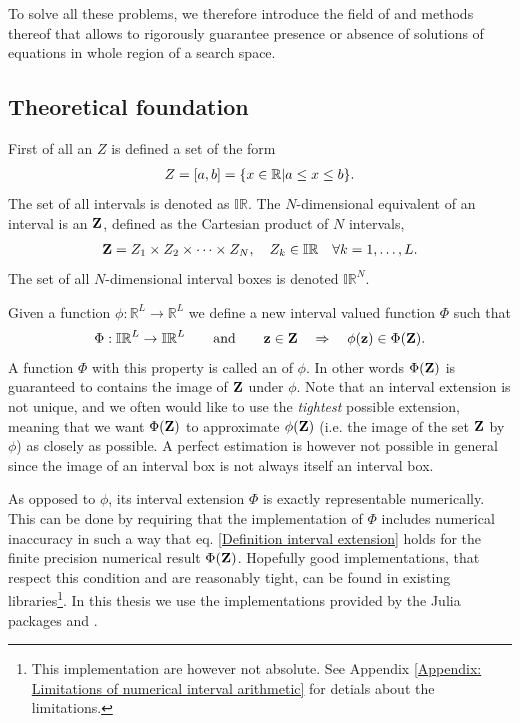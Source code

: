 \documentclass[
11pt, %
american, %
singlespacing, %
final, %
nolistspacing, %
liststotoc, %
headsepline, %
]{MastersDoctoralThesis} %
\begin{document}
To solve all these problems, we therefore introduce the field of  and methods thereof that allows to rigorously guarantee presence or absence of solutions of equations in whole region of a search space.

\subsection{Theoretical foundation}
\label{Section: Theoretical foundation of IA}

First of all an  $Z$ is defined a set of the form
\begin{align}
	Z = \left[a, b\right] = \{x \in \mathbb{R} | a \leq x \leq b\}.
\end{align}
The set of all intervals is denoted as $\mathbb{IR}$. The $N$-dimensional equivalent of an interval is an  $\boldsymbol{\mathrm{Z}}$, defined as the Cartesian product of $N$ intervals,
\begin{align}
	\boldsymbol{\mathrm{Z}} = Z_1 \times Z_2 \times \cdots \times Z_N, \quad Z_k \in \mathbb{IR} \quad \forall k = 1, \dots, L.
\end{align}
The set of all $N$-dimensional interval boxes is denoted $\mathbb{IR}^N$.

Given a function $\phi : \mathbb{R}^L \rightarrow \mathbb{R}^L$ we define a new interval valued function $\Phi$ such that
\begin{align}
	\Phi : \mathbb{IR}^L \rightarrow \mathbb{IR}^L \qquad \text{and} \qquad \boldsymbol{\mathrm{z}} \in \boldsymbol{\mathrm{Z}} \quad \Rightarrow \quad \phi(\boldsymbol{\mathrm{z}}) \in \Phi(\boldsymbol{\mathrm{Z}}). \label{Definition interval extension}
\end{align}
A function $\Phi$ with this property is called an  of $\phi$. In other words $\Phi(\boldsymbol{\mathrm{Z}})$ is guaranteed to contains the image of $\boldsymbol{\mathrm{Z}}$ under $\phi$. Note that an interval extension is not unique, and we often would like to use the \emph{tightest} possible extension, meaning that we want $\Phi(\boldsymbol{\mathrm{Z}})$ to approximate $\phi(\boldsymbol{\mathrm{Z}})$ (i.e. the image of the set $\boldsymbol{\mathrm{Z}}$ by $\phi$) as closely as possible. A perfect estimation is however not possible in general since the image of an interval box is not always itself an interval box.

As opposed to $\phi$, its interval extension $\Phi$ is exactly representable numerically. This can be done by requiring that the implementation of $\Phi$ includes numerical inaccuracy in such a way that eq. \eqref{Definition interval extension} holds for the finite precision numerical result $\Phi(\boldsymbol{\mathrm{Z}})$. Hopefully good implementations, that respect this condition and are reasonably tight, can be found in existing libraries\footnote{This implementation are however not absolute. See Appendix \ref{Appendix: Limitations of numerical interval arithmetic} for detials about the limitations.}. In this thesis we use the implementations provided by the Julia packages  \cite{intervalarithmetic} and  \cite{intervalrootfinding}.
\end{document}
